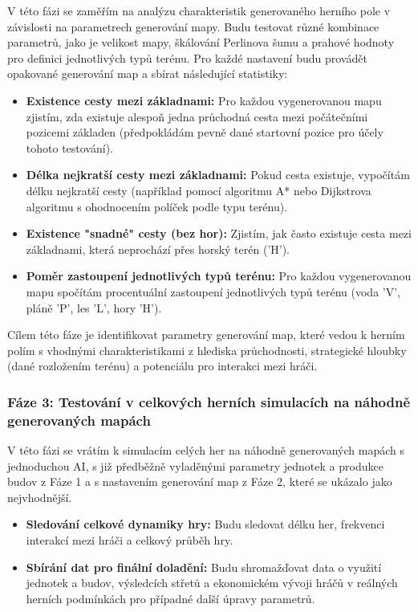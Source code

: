 V této fázi se zaměřím na analýzu charakteristik generovaného herního pole v závislosti na parametrech generování mapy. Budu testovat různé kombinace parametrů, jako je velikost mapy, škálování Perlinova šumu a prahové hodnoty pro definici jednotlivých typů terénu. Pro každé nastavení budu provádět opakované generování map a sbírat následující statistiky:

\begin{itemize}
\item \textbf{Existence cesty mezi základnami:} Pro každou vygenerovanou mapu zjistím, zda existuje alespoň jedna průchodná cesta mezi počátečními pozicemi základen (předpokládám pevně dané startovní pozice pro účely tohoto testování).
\item \textbf{Délka nejkratší cesty mezi základnami:} Pokud cesta existuje, vypočítám délku nejkratší cesty (například pomocí algoritmu A* nebo Dijkstrova algoritmu s ohodnocením políček podle typu terénu).
\item \textbf{Existence "snadné" cesty (bez hor):} Zjistím, jak často existuje cesta mezi základnami, která neprochází přes horský terén ('H').
\item \textbf{Poměr zastoupení jednotlivých typů terénu:} Pro každou vygenerovanou mapu spočítám procentuální zastoupení jednotlivých typů terénu (voda 'V', pláně 'P', les 'L', hory 'H').
\end{itemize}

Cílem této fáze je identifikovat parametry generování map, které vedou k herním polím s vhodnými charakteristikami z hlediska průchodnosti, strategické hloubky (dané rozložením terénu) a potenciálu pro interakci mezi hráči.

\subsubsection{Fáze 3: Testování v celkových herních simulacích na náhodně generovaných mapách}

V této fázi se vrátím k simulacím celých her na náhodně generovaných mapách s jednoduchou AI, s již předběžně vyladěnými parametry jednotek a produkce budov z Fáze 1 a s nastavením generování map z Fáze 2, které se ukázalo jako nejvhodnější.

\begin{itemize}
\item \textbf{Sledování celkové dynamiky hry:} Budu sledovat délku her, frekvenci interakcí mezi hráči a celkový průběh hry.
\item \textbf{Sbírání dat pro finální doladění:} Budu shromažďovat data o využití jednotek a budov, výsledcích střetů a ekonomickém vývoji hráčů v reálných herních podmínkách pro případné další úpravy parametrů.
\end{itemize}